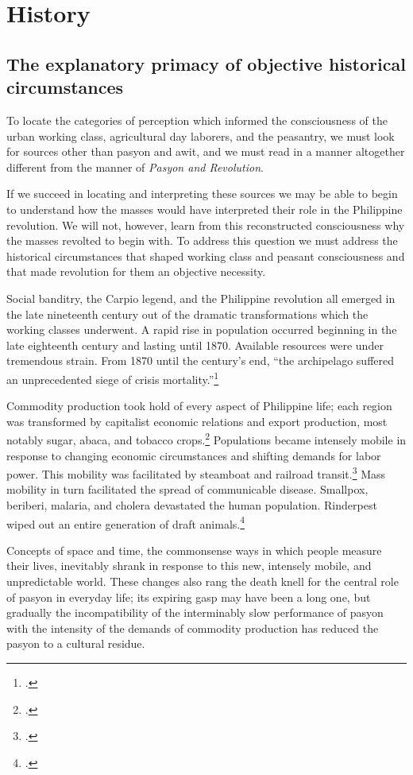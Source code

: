 \section{History}
\subsection{The explanatory primacy of objective historical circumstances}

To locate the categories of perception which informed the consciousness of the urban working class, agricultural day laborers, and the peasantry, we must look for sources other than pasyon and awit, and we must read in a manner altogether different from the manner of \textit{Pasyon and Revolution}. 

If we succeed in locating and interpreting these sources we may be able to begin to understand how the masses would have interpreted their role in the Philippine revolution. We will not, however, learn from this reconstructed consciousness why the masses revolted to begin with. To address this question we must address the historical circumstances that shaped working class and peasant consciousness and that made revolution for them an objective necessity.

Social banditry, the Carpio legend, and the Philippine revolution all emerged in the late nineteenth century out of the dramatic transformations which the working classes underwent. A rapid rise in population occurred beginning in the late eighteenth century and lasting until 1870.  Available resources were under tremendous strain. From 1870 until the century's end, \enquote{the archipelago suffered an unprecedented siege of crisis mortality.}\footcite[4]{Doeppers1998}

Commodity production took hold of every aspect of Philippine life; each region was transformed by capitalist economic relations and export production, most notably sugar, abaca, and tobacco crops.\footcites{Fast1979}{Owen1984}{DeJesus1980} Populations became intensely mobile in response to changing economic circumstances and shifting demands for labor power. This mobility was facilitated by steamboat and railroad transit.\footcite{Corpuz1999} Mass mobility in turn facilitated the spread of communicable disease. Smallpox, beriberi, malaria, and cholera devastated the human population. Rinderpest wiped out an entire generation of draft animals.\footcite{DeBevoise1995}

Concepts of space and time, the commonsense ways in which people measure their lives, inevitably shrank in response to this new, intensely mobile, and unpredictable world. These changes also rang the death knell for the central role of pasyon in everyday life; its expiring gasp may have been a long one, but gradually the incompatibility of the interminably slow performance of pasyon with the intensity of the demands of commodity production has reduced the pasyon to a cultural residue.

